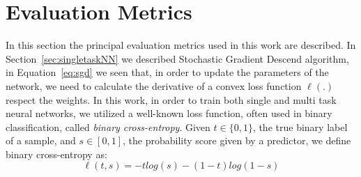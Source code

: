 \section{Evaluation Metrics}
In this section the principal evaluation metrics used in this work are described. 
In Section~\ref{sec:singletaskNN} we described Stochastic Gradient Descend algorithm, in Equation~\ref{eq:sgd} we seen that, in order to update the parameters of the network, we need to calculate the derivative of a convex loss function $\ell(.)$ respect the weights. In this work, in order to train both single and multi task neural networks, we utilized a well-known loss function, often used in binary classification, called \emph{binary cross-entropy}. Given $t \in \{0, 1\}$, the true binary label of a sample, and $s \in [0, 1]$, the probability score given by a predictor, we define binary cross-entropy as:
\begin{equation}
    \ell(t, s) = -tlog(s) - (1 - t)log(1 - s)
\end{equation}

